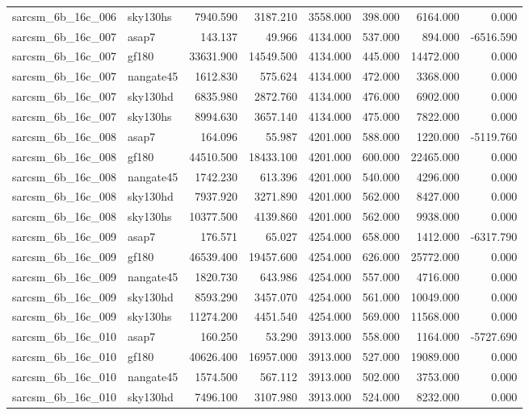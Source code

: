 \begin{tabular}{llrrrrrr}
sarcsm\_6b\_16c\_006 & sky130hs & 7940.590 & 3187.210 & 3558.000 & 398.000 & 6164.000 & 0.000 \\
sarcsm\_6b\_16c\_007 & asap7 & 143.137 & 49.966 & 4134.000 & 537.000 & 894.000 & -6516.590 \\
sarcsm\_6b\_16c\_007 & gf180 & 33631.900 & 14549.500 & 4134.000 & 445.000 & 14472.000 & 0.000 \\
sarcsm\_6b\_16c\_007 & nangate45 & 1612.830 & 575.624 & 4134.000 & 472.000 & 3368.000 & 0.000 \\
sarcsm\_6b\_16c\_007 & sky130hd & 6835.980 & 2872.760 & 4134.000 & 476.000 & 6902.000 & 0.000 \\
sarcsm\_6b\_16c\_007 & sky130hs & 8994.630 & 3657.140 & 4134.000 & 475.000 & 7822.000 & 0.000 \\
sarcsm\_6b\_16c\_008 & asap7 & 164.096 & 55.987 & 4201.000 & 588.000 & 1220.000 & -5119.760 \\
sarcsm\_6b\_16c\_008 & gf180 & 44510.500 & 18433.100 & 4201.000 & 600.000 & 22465.000 & 0.000 \\
sarcsm\_6b\_16c\_008 & nangate45 & 1742.230 & 613.396 & 4201.000 & 540.000 & 4296.000 & 0.000 \\
sarcsm\_6b\_16c\_008 & sky130hd & 7937.920 & 3271.890 & 4201.000 & 562.000 & 8427.000 & 0.000 \\
sarcsm\_6b\_16c\_008 & sky130hs & 10377.500 & 4139.860 & 4201.000 & 562.000 & 9938.000 & 0.000 \\
sarcsm\_6b\_16c\_009 & asap7 & 176.571 & 65.027 & 4254.000 & 658.000 & 1412.000 & -6317.790 \\
sarcsm\_6b\_16c\_009 & gf180 & 46539.400 & 19457.600 & 4254.000 & 626.000 & 25772.000 & 0.000 \\
sarcsm\_6b\_16c\_009 & nangate45 & 1820.730 & 643.986 & 4254.000 & 557.000 & 4716.000 & 0.000 \\
sarcsm\_6b\_16c\_009 & sky130hd & 8593.290 & 3457.070 & 4254.000 & 561.000 & 10049.000 & 0.000 \\
sarcsm\_6b\_16c\_009 & sky130hs & 11274.200 & 4451.540 & 4254.000 & 569.000 & 11568.000 & 0.000 \\
sarcsm\_6b\_16c\_010 & asap7 & 160.250 & 53.290 & 3913.000 & 558.000 & 1164.000 & -5727.690 \\
sarcsm\_6b\_16c\_010 & gf180 & 40626.400 & 16957.000 & 3913.000 & 527.000 & 19089.000 & 0.000 \\
sarcsm\_6b\_16c\_010 & nangate45 & 1574.500 & 567.112 & 3913.000 & 502.000 & 3753.000 & 0.000 \\
sarcsm\_6b\_16c\_010 & sky130hd & 7496.100 & 3107.980 & 3913.000 & 524.000 & 8232.000 & 0.000 \\

\end{tabular}
